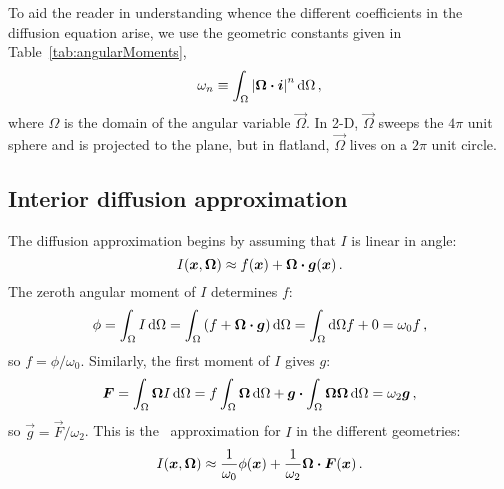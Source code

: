 To aid the reader in understanding whence the different coefficients in the
diffusion equation arise, we use the geometric constants given in
Table~\ref{tab:angularMoments},
\begin{equation*}
  \omega_n \equiv \int_\Omega \left| \bm{\Omega} \bm{\cdot} \bm{i} \right|^n \mathop{}\!\mathrm{d} \Omega\,,
\end{equation*}
where $\Omega$ is the domain of the angular variable $\vec{\Omega}$. In 2-D,
$\vec{\Omega}$ sweeps the $4\pi$ unit sphere and is projected to the plane, but
in flatland, $\vec{\Omega}$ lives on a $2\pi$ unit circle.

\subsection{Interior diffusion approximation}

The diffusion approximation begins by assuming that $I$ is linear in angle:
\begin{equation*}
  I(\bm{x}, \bm{\Omega}) \approx f(\bm{x}) + \bm{\Omega} \bm{\cdot}
  \bm{g}(\bm{x})\,.
\end{equation*}
The zeroth angular moment of $I$ determines $f$:
\begin{equation*}
  \phi = \int_\Omega I \mathop{}\!\mathrm{d} \Omega
= \int_\Omega \left( f + \bm{\Omega}\bm{\cdot} \bm{g} \right) \mathop{}\!\mathrm{d}\Omega
= \int_\Omega\mathop{}\!\mathrm{d}\Omega f + 0
= \omega_0 f \,,
\end{equation*}
so $f = \phi/\omega_0$. Similarly, the first moment of $I$ gives $g$:
\begin{equation*}
  \bm{F} = \int_\Omega \bm{\Omega} I \mathop{}\!\mathrm{d} \Omega
= f \int_\Omega \bm{\Omega} \mathop{}\!\mathrm{d}\Omega
  + \bm{g} \bm{\cdot} \int_\Omega \bm{\Omega}\bm{\Omega} \mathop{}\!\mathrm{d}\Omega
= \omega_2 \bm{g} \,,
\end{equation*}
so $\vec{g} = \vec{F}/\omega_2$. This is the \Pone\ approximation for $I$ in the different geometries:
\begin{equation}\label{eq:ssPone}
  I(\bm{x}, \bm{\Omega})
  \approx \frac{1}{\omega_0} \phi(\bm{x})
  + \frac{1}{\omega_2} \bm{\Omega} \bm{\cdot} \bm{F}(\bm{x})\,.
\end{equation}

